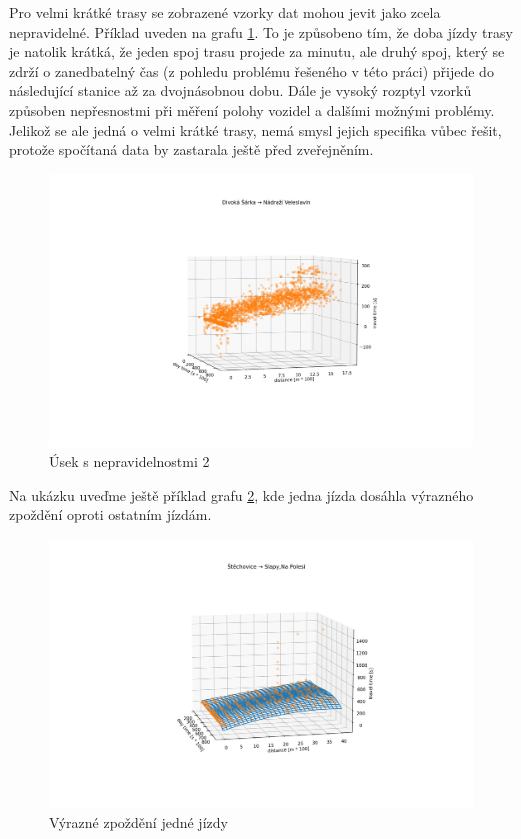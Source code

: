 Pro velmi krátké trasy se zobrazené vzorky dat mohou jevit jako zcela nepravidelné. Příklad uveden na grafu \ref{fig:divoka_sarka_veleslavin}. To je způsobeno tím, že doba jízdy trasy je natolik krátká, že jeden spoj trasu projede za minutu, ale druhý spoj, který se zdrží o zanedbatelný čas (z pohledu problému řešeného v této práci) přijede do následující stanice až za dvojnásobnou dobu. Dále je vysoký rozptyl vzorků způsoben nepřesnostmi při měření polohy vozidel a dalšími možnými problémy. Jelikož se ale jedná o velmi krátké trasy, nemá smysl jejich specifika vůbec řešit, protože spočítaná data by zastarala ještě před zveřejněním.


\begin{figure}
\centering
  \includegraphics[width=\linewidth]{../img/divoka_sarka_veleslavin.png}
  \caption{Úsek s nepravidelnostmi 2}
  \label{fig:divoka_sarka_veleslavin}
\end{figure}


Na ukázku uveďme ještě příklad grafu \ref{fig:delayed_trip}, kde jedna jízda dosáhla výrazného zpoždění oproti ostatním jízdám.


\begin{figure}
\centering
  \includegraphics[width=\linewidth]{../img/delayed_trip.png}
  \caption{Výrazné zpoždění jedné jízdy}
  \label{fig:delayed_trip}
\end{figure}


